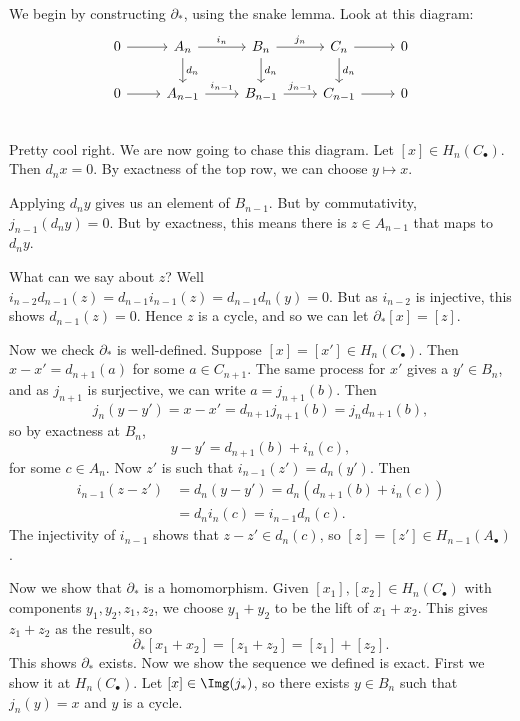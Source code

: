 \documentclass[12pt]{article}
\begin{document}
\begin{proofbox}
	We begin by constructing $\partial_\ast$, using the snake lemma. Look at this diagram:
	\begin{equation*}
	\begin{tikzcd}
		0 \arrow[r] & A_n \arrow[r, "i_n"] \arrow[d, "d_n"] & B_n \arrow[r, "j_n"] \arrow[d, "d_n"] & C_n \arrow[d, "d_n"] \arrow[r] & 0 \\
		0 \arrow[r] & A_{n-1} \arrow[r, "i_{n-1}"] & B_{n-1} \arrow[r, "j_{n-1}"] & C_{n-1} \arrow[r] & 0 \\
	\end{tikzcd}
	\end{equation*}
	Pretty cool right. We are now going to chase this diagram. Let $[x] \in H_n(C_\bullet)$. Then $d_n x = 0$. By exactness of the top row, we can choose $y \mapsto x$.

	Applying $d_n y$ gives us an element of $B_{n-1}$. But by commutativity, $j_{n-1}(d_n y) = 0$. But by exactness, this means there is $z \in A_{n-1}$ that maps to $d_{n} y$.

	What can we say about $z$? Well $i_{n-2} d_{n-1}(z) = d_{n-1} i_{n-1}(z) = d_{n-1} d_n (y) = 0$. But as $i_{n-2}$ is injective, this shows $d_{n-1}(z) = 0$. Hence $z$ is a cycle, and so we can let $\partial_\ast[x] = [z]$.

	Now we check $\partial_\ast$ is well-defined. Suppose $[x] = [x'] \in H_n(C_\bullet)$. Then $x - x' = d_{n+1}(a)$ for some $a \in C_{n+1}$. The same process for $x'$ gives a $y' \in B_n$, and as $j_{n+1}$ is surjective, we can write $a = j_{n+1}(b)$. Then
	\[
	j_n(y - y') = x- x' =  d_{n+1}j_{n+1}(b) = j_n d_{n+1}(b),
	\]
	so by exactness at $B_n$,
	\[
	y - y' = d_{n+1}(b) + i_n(c),
	\]
	for some $c \in A_n$. Now $z'$ is such that $i_{n-1}(z') = d_n(y')$. Then
	\begin{align*}
		i_{n-1}(z - z') &= d_n(y - y') = d_n(d_{n+1}(b) + i_n(c)) \\
				&= d_n i_n(c) = i_{n-1} d_n(c).
	\end{align*}
	The injectivity of $i_{n-1}$ shows that $z - z' \in d_n(c)$, so $[z] = [z'] \in H_{n-1}(A_\bullet)$.

	Now we show that $\partial_\ast$ is a homomorphism. Given $[x_1], [x_2] \in H_n(C_\bullet)$ with components $y_1, y_2, z_1, z_2$, we choose $y_1 + y_2$ to be the lift of $x_1 + x_2$. This gives $z_1 + z_2$ as the result, so
	\[
		\partial_\ast[x_1 + x_2] = [z_1 + z_2] = [z_1] + [z_2].
	\]
	This shows $\partial_\ast$ exists. Now we show the sequence we defined is exact. First we show it at $H_n(C_\bullet)$. Let $[x] \in \Img(j_\ast)$, so there exists $y \in B_n$ such that $j_n(y) = x$ and $y$ is a cycle.


\end{proofbox}
\end{document}
